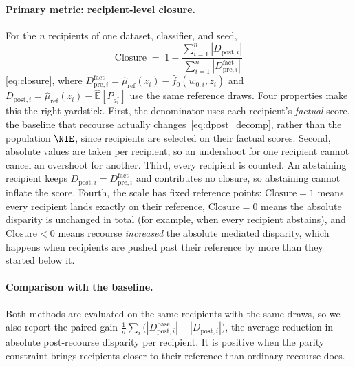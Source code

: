 \paragraph{Primary metric: recipient-level closure.}
For the $n$ recipients of one dataset, classifier, and seed,
\begin{equation*}
  \mathrm{Closure}
  \;=\;1-\frac{\sum_{i=1}^n|D_{\mathrm{post},i}|}{\sum_{i=1}^n|D^{\mathrm{fact}}_{\mathrm{pre},i}|}
\end{equation*}
\eqref{eq:closure}, where
$D^{\mathrm{fact}}_{\mathrm{pre},i}=\hat\mu_{\mathrm{ref}}(z_i)-\hat f_0(w_{0,i},z_i)$
and
$D_{\mathrm{post},i}=\hat\mu_{\mathrm{ref}}(z_i)-\widehat{\mathbb E}[P_{a^*_i}]$
use the same reference draws. Four properties make this the right yardstick.
First, the denominator uses each recipient's \emph{factual} score, the
baseline that recourse actually changes~\eqref{eq:dpost_decomp}, rather than
the population $\NIE$, since recipients are selected on their factual scores.
Second, absolute values are taken per recipient, so an undershoot for one
recipient cannot cancel an overshoot for another.
Third, every recipient is counted. An abstaining recipient keeps
$D_{\mathrm{post},i}=D^{\mathrm{fact}}_{\mathrm{pre},i}$ and contributes no
closure, so abstaining cannot inflate the score.
Fourth, the scale has fixed reference points:
$\mathrm{Closure}=1$ means every recipient lands exactly on their reference,
$\mathrm{Closure}=0$ means the absolute disparity is unchanged in total (for
example, when every recipient abstains), and $\mathrm{Closure}<0$ means
recourse \emph{increased} the absolute mediated disparity, which happens when
recipients are pushed past their reference by more than they started below it.

\paragraph{Comparison with the baseline.}
Both methods are evaluated on the same recipients with the same draws, so we
also report the paired gain
$\frac1n\sum_i\bigl(|D^{\mathrm{base}}_{\mathrm{post},i}|-|D_{\mathrm{post},i}|\bigr)$,
the average reduction in absolute post-recourse disparity per recipient.
It is positive when the parity constraint brings recipients closer to their
reference than ordinary recourse does.

